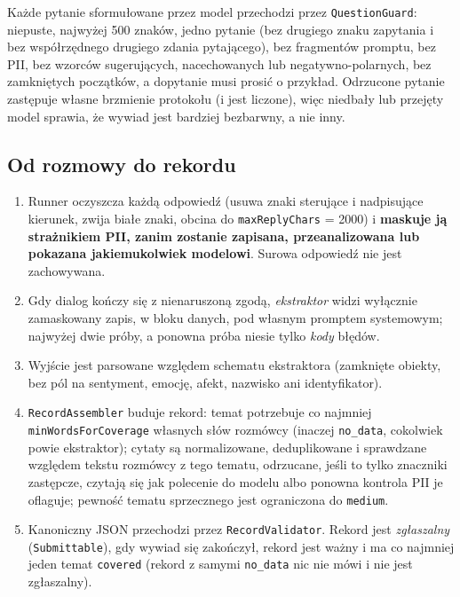 Każde pytanie sformułowane przez model przechodzi przez \texttt{QuestionGuard}:
niepuste, najwyżej 500 znaków, jedno pytanie (bez drugiego znaku zapytania
i bez współrzędnego drugiego zdania pytającego), bez fragmentów promptu,
bez PII, bez wzorców sugerujących, nacechowanych lub negatywno-polarnych,
bez zamkniętych początków, a dopytanie musi prosić o przykład. Odrzucone pytanie
zastępuje własne brzmienie protokołu (i jest liczone), więc niedbały lub
przejęty model sprawia, że wywiad jest bardziej bezbarwny, a nie inny.

\subsection{Od rozmowy do rekordu}

\begin{enumerate}[itemsep=2pt]
  \item Runner oczyszcza każdą odpowiedź (usuwa znaki sterujące i nadpisujące
        kierunek, zwija białe znaki, obcina do \texttt{maxReplyChars} = 2000)
        i \textbf{maskuje ją strażnikiem PII, zanim zostanie zapisana,
        przeanalizowana lub pokazana jakiemukolwiek modelowi}. Surowa odpowiedź
        nie jest zachowywana.
  \item Gdy dialog kończy się z nienaruszoną zgodą, \emph{ekstraktor} widzi
        wyłącznie zamaskowany zapis, w bloku danych, pod własnym promptem
        systemowym; najwyżej dwie próby, a ponowna próba niesie tylko \emph{kody}
        błędów.
  \item Wyjście jest parsowane względem schematu ekstraktora (zamknięte
        obiekty, bez pól na sentyment, emocję, afekt, nazwisko ani
        identyfikator).
  \item \texttt{RecordAssembler} buduje rekord: temat potrzebuje co najmniej
        \texttt{minWordsForCoverage} własnych słów rozmówcy (inaczej
        \texttt{no\_data}, cokolwiek powie ekstraktor); cytaty są normalizowane,
        deduplikowane i sprawdzane względem tekstu rozmówcy z tego tematu,
        odrzucane, jeśli to tylko znaczniki zastępcze, czytają się jak polecenie
        do modelu albo ponowna kontrola PII je oflaguje; pewność tematu
        sprzecznego jest ograniczona do \texttt{medium}.
  \item Kanoniczny JSON przechodzi przez \texttt{RecordValidator}. Rekord jest
        \emph{zgłaszalny} (\texttt{Submittable}), gdy wywiad się zakończył,
        rekord jest ważny i ma co najmniej jeden temat \texttt{covered}
        (rekord z samymi \texttt{no\_data} nic nie mówi i nie jest zgłaszalny).
\end{enumerate}

